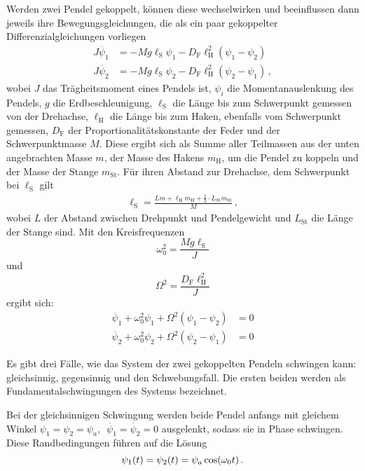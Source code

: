 \documentclass[
12pt,
a4paper,
bibliography=totocnumbered, %
BCOR=1cm, %
oneside, %
]{scrartcl}
\newcommand{\lh}{\ell_{\mathrm{H}}}
\newcommand{\ls}{\ell_{\mathrm{S}}}
\begin{document}
Werden zwei Pendel gekoppelt, können diese wechselwirken und beeinflussen dann jeweils ihre Bewegungsgleichungen, die als ein paar gekoppelter Differenzialgleichungen vorliegen
\begin{align}
	J\ddot{\psi_1} &= -Mg\ls\psi_1 - D_{\text{F}}\lh^2(\psi_1-\psi_2)\\
	J\ddot{\psi_2} &= -Mg\ls\psi_2 - D_{\text{F}}\lh^2(\psi_2-\psi_1)\,,
\end{align}
wobei \(J\) das Trägheitsmoment eines Pendels ist, \(\psi_i\) die Momentanauslenkung des Pendels, \(g\) die Erdbeschleunigung, \(\ls\) die Länge bis zum Schwerpunkt gemessen von der Drehachse, \(\lh\) die Länge bis zum Haken, ebenfalls vom Schwerpunkt gemessen, \(D_{\text{F}}\) der Proportionalitätskonstante der Feder und der Schwerpunktmasse \(M\). Diese  ergibt sich als Summe aller Teilmassen aus der unten angebrachten Masse \(m\),  der Masse des Hakens \(m_{\text{H}}\), um die Pendel zu koppeln und der Masse der Stange \(m_{\text{St}}\). Für ihren Abstand zur Drehachse, dem Schwerpunkt bei \(\ell_{\text{S}}\) gilt
\begin{align}\label{eq:schwerp}
	\ell_{\text{S}} = \frac{Lm + \lh m_{\text{H}} + \frac{1}{2} \cdot L_{\text{St}} m_{\text{St}}}{M} \,,
\end{align}
wobei \(L\) der Abstand zwischen Drehpunkt und Pendelgewicht und \(L_{\text{St}}\) die Länge der Stange sind.
Mit den Kreisfrequenzen
\begin{equation}\label{eq:eig}
	\omega_0^2=\frac{Mg\ls}{J}
\end{equation}
und
\begin{equation}
	\Omega^2=\frac{D_{\text{F}}\lh^2}{J}
\end{equation}
ergibt sich:
\begin{align}
	\ddot{\psi_1} + \omega_0^2\psi_1 + \Omega^2(\psi_1-\psi_2) &= 0\\
	\ddot{\psi_2} + \omega_0^2\psi_2 + \Omega^2(\psi_2-\psi_1) &= 0
\end{align}

Es gibt drei Fälle, wie das System der zwei gekoppelten Pendeln schwingen kann: gleichsinnig, gegensinnig und den Schwebungsfall. Die ersten beiden werden als Fundamentalschwingungen des Systems bezeichnet.

Bei der gleichsinnigen Schwingung werden beide Pendel anfangs mit gleichem Winkel \(\psi_1 = \psi_2 = \psi_a, \enspace \dot{\psi_1} = \dot{\psi_2} = 0\) ausgelenkt, sodass sie in Phase schwingen. Diese Randbedingungen führen auf die Lösung
\begin{equation}
	\psi_1(t) = \psi_2(t) = \psi_a \cos\mleft(\omega_0t\mright) \,.
\end{equation}
\end{document}

